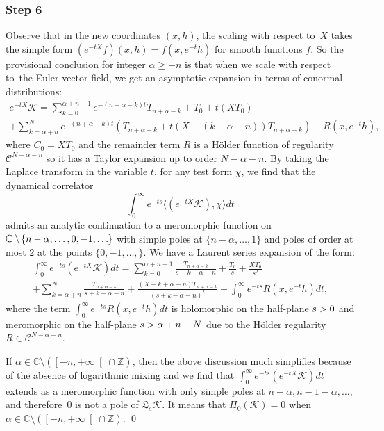 \documentclass[10pt]{amsart}
\let\pazocal\mathscr
\theoremstyle{definition}
\let\cv\alpha
\let\euler X
\let\Re\relax
\DeclareMathOperator{\Re}{Re}
\newcommand{\clopen}[1]{\mathopen{}\mathclose{\left[#1 \right[}}
\newcommand{\step}[1]{\subsubsection*{Step #1}}
\begin{document}
\step{6} Observe that in the new coordinates $(x,h)$,
the scaling with respect to~$\euler$ takes the simple form
$ {\left(e^{-t\euler}f\right)} (x,h) = f(x,e^{-t} h)$ for smooth functions $f$.
So the provisional conclusion for integer $\cv\geqslant -n$ is that when we scale with respect to~the Euler vector field, we get an asymptotic expansion
in terms of conormal distributions:
\begin{multline*}
e^{-t\euler}\pazocal{K}=\sum_{k=0}^{\cv+n-1} {e^{-(n+\cv-k)t}} T_{n+\cv-k}+T_0+t\left(\euler T_0\right) \\
+\sum_{k=\cv+n }^N
{e^{-(n+\cv-k)t}} \left(T_{n+\cv-k}+t (\euler -(k-\cv-n)) T_{n+\cv-k} \right) + R(x,e^{-t}h),
\end{multline*}
where $C_0=\euler T_0$ and the remainder term $R$ is a Hölder function of regularity $\pazocal{C}^{N-\cv-n}$ so it has a Taylor expansion up to order $N-\cv-n$.
By taking the Laplace transform in the variable $t$, for any test form $\chi$, we find that the dynamical correlator
\[
\int_0^\infty e^{-ts}\langle {(e^{-t\euler} \pazocal{K})},\chi\rangle dt
\]
admits an analytic continuation
to a meromorphic function on $\mathbb{C}\setminus\mkern-2mu \{n-\cv,\dots ,0 ,-1,\dots\mkern-1mu\}$
with simple poles at $\{n-\cv,\dots ,1 \}$ and poles of order at most $2$
at the points $\{0,-1,\dots, \}$.
We have a Laurent series expansion of the form:
\begin{multline*}
\int_0^\infty e^{-ts} {(e^{-t\euler} \pazocal{K})} dt=\sum_{k=0}^{\cv+n-1} \frac{T_{n+\cv-k}}{s+k-\cv-n}+ \frac{T_0}{s}+\frac{\euler T_0}{s^2}
\\
+\sum_{k=\cv+n }^N \frac{T_{n+\cv-k}}{s+k-\cv-n}+ \frac{(\euler-k+\cv+n)T_{n+\cv-k}}{(s+k-\cv-n)^2 } + \int_0^\infty e^{-ts} R(x,e^{-t}h) dt,
\end{multline*}
where the term $\int_0^\infty e^{-ts} R(x,e^{-t}h)dt$ is holomorphic on the half-plane $\Re s >0$ and meromorphic
on the half-plane $\Re s > \cv+n-N$ due to the Hölder regularity $R\in \pazocal{C}^{N-\cv-n}$.

If $\cv\in\mathbb{C}\setminus(\clopen{-n,+\infty}\cap \mathbb{Z})$, then the above discussion much simplifies because of the absence of logarithmic mixing and we find that $\int_0^\infty e^{-ts} \left(e^{-t\euler}\pazocal{K}\right) dt$ extends as a meromorphic function with only simple poles at $n-\cv, n-1-\cv,\dots,$ and therefore~$0$ is not a pole of $\mathfrak{L}_s\pazocal{K}$. It means that $\Pi_0(\pazocal{K})=0$ when $\cv\in\mathbb{C}\setminus(\clopen{-n,+\infty}\cap \mathbb{Z})$.
\qed
\end{document}
